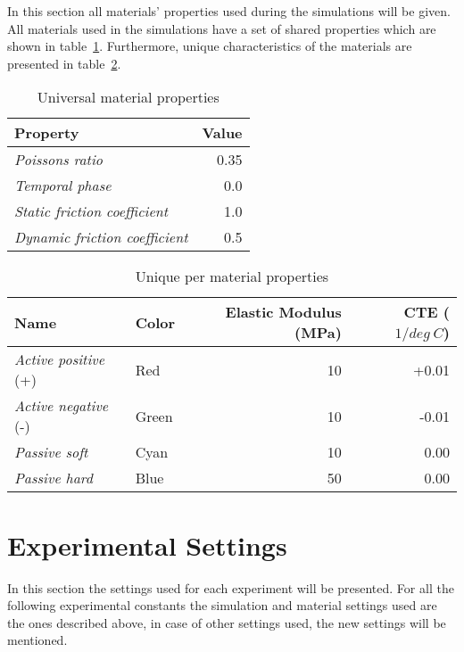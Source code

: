 In this section all materials' properties used during the simulations will be given. All materials used in the simulations have a set of shared properties which are shown in table~\ref{UniversalMaterialProperties}. Furthermore, unique characteristics of the materials are presented in table~\ref{UniqueMaterialProperties}.

\begin{table}[h!]
\caption{Universal material properties}
\label{UniversalMaterialProperties}
\begin{center}
    \begin{tabular}{lr}
    \textbf{Property} & \textbf{Value}\\
    \hline
    \emph{Poissons ratio} & 0.35\\
    \emph{Temporal phase}        & 0.0\\
    \emph{Static friction coefficient}       & 1.0\\
    \emph{Dynamic friction coefficient} & 0.5
    \end{tabular}
    \end{center}
\end{table}


\begin{table}[h!]
\caption{Unique per material properties}
\label{UniqueMaterialProperties}
\begin{center}
    \begin{tabular}{llrr}
    \textbf{Name}                & \textbf{Color} & \textbf{Elastic Modulus} (MPa) & \textbf{CTE} ($1/deg\ C$) \\
    \hline
    \emph{Active positive} (+) & Red   & 10                    & +0.01\\
    \emph{Active negative} (-) & Green & 10                   & -0.01 \\
    \emph{Passive soft}       & Cyan  & 10                   & 0.00 \\
    \emph{Passive hard}        & Blue  & 50                   & 0.00
    \end{tabular}
    \end{center}
\end{table}


\section{Experimental Settings}
In this section the settings used for each experiment will be presented. For all the following experimental constants the simulation and material settings used are the ones described above, in case of other settings used, the new settings will be mentioned.

